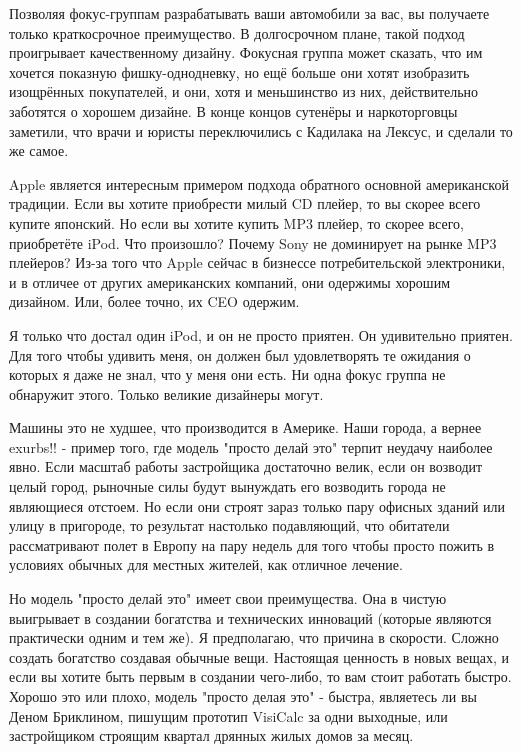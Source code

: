 \documentclass[ebook,12pt,oneside,openany]{memoir}
\begin{document}
Позволяя фокус-группам разрабатывать ваши автомобили за вас, вы
получаете только краткосрочное преимущество. В долгосрочном плане,
такой подход проигрывает качественному дизайну. Фокусная группа может
сказать, что им хочется показную фишку-однодневку, но ещё больше они
хотят изобразить изощрённых покупателей, и они, хотя и меньшинство из
них, действительно заботятся о хорошем дизайне. В конце концов
сутенёры и наркоторговцы заметили, что врачи и юристы переключились с
Кадилака на Лексус, и сделали то же самое.

Apple является интересным примером подхода обратного основной
американской традиции. Если вы хотите приобрести милый CD плейер, то
вы скорее всего купите японский. Но если вы хотите купить MP3 плейер,
то скорее всего, приобретёте iPod. Что произошло? Почему Sony не
доминирует на рынке MP3 плейеров? Из-за того что Apple сейчас в
бизнессе потребительской электроники, и в отличее от других
американских компаний, они одержимы хорошим дизайном. Или, более
точно, их CEO одержим.

Я только что достал один iPod, и он не просто приятен. Он удивительно
приятен. Для того чтобы удивить меня, он должен был удовлетворять те
ожидания о которых я даже не знал, что у меня они есть. Ни одна фокус
группа не обнаружит этого. Только великие дизайнеры могут.

Машины это не худшее, что производится в Америке. Наши города, а
вернее exurbs!! - пример того, где модель "просто делай это" терпит
неудачу наиболее явно. Если масштаб работы застройщика достаточно
велик, если он возводит целый город, рыночные силы будут вынуждать его
возводить города не являющиеся отстоем. Но если они строят зараз
только пару офисных зданий или улицу в пригороде, то результат
настолько подавляющий, что обитатели рассматривают полет в Европу на
пару недель для того чтобы просто пожить в условиях обычных для
местных жителей, как отличное лечение.

Но модель "просто делай это" имеет свои преимущества. Она в чистую
выигрывает в создании богатства и технических инноваций (которые
являются практически одним и тем же). Я предполагаю, что причина в
скорости. Сложно создать богатство создавая обычные вещи. Настоящая
ценность в новых вещах, и если вы хотите быть первым в создании
чего-либо, то вам стоит работать быстро. Хорошо это или плохо, модель
"просто делая это" - быстра, являетесь ли вы Деном Бриклином, пишущим
прототип VisiCalc за одни выходные, или застройщиком строящим квартал
дрянных жилых домов за месяц.
\end{document}
